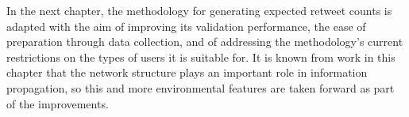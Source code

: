 In the next chapter, the methodology for generating expected retweet counts is adapted with the aim of improving its validation performance, the ease of preparation through data collection, and of addressing the methodology's current restrictions on the types of users it is suitable for. It is known from work in this chapter that the network structure plays an important role in information propagation, so this and more environmental features are taken forward as part of the improvements. 
